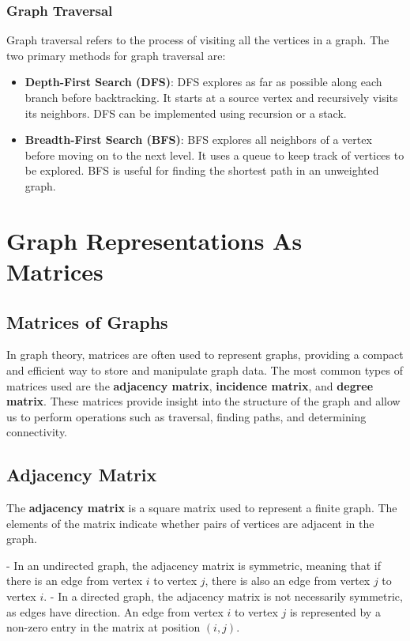 \documentclass{book}
\begin{document}
\subsection{Graph Traversal}

Graph traversal refers to the process of visiting all the vertices in a graph. The two primary methods for graph traversal are:

\begin{itemize}
    \item \textbf{Depth-First Search (DFS)}: DFS explores as far as possible along each branch before backtracking. It starts at a source vertex and recursively visits its neighbors. DFS can be implemented using recursion or a stack.
    \item \textbf{Breadth-First Search (BFS)}: BFS explores all neighbors of a vertex before moving on to the next level. It uses a queue to keep track of vertices to be explored. BFS is useful for finding the shortest path in an unweighted graph.
\end{itemize}

\twocolumn
\chapter{Graph Representations As Matrices}

\section{Matrices of Graphs}

In graph theory, matrices are often used to represent graphs, providing a compact and efficient way to store and manipulate graph data. The most common types of matrices used are the \textbf{adjacency matrix}, \textbf{incidence matrix}, and \textbf{degree matrix}. These matrices provide insight into the structure of the graph and allow us to perform operations such as traversal, finding paths, and determining connectivity.

\section{Adjacency Matrix}

The \textbf{adjacency matrix} is a square matrix used to represent a finite graph. The elements of the matrix indicate whether pairs of vertices are adjacent in the graph. 

- In an undirected graph, the adjacency matrix is symmetric, meaning that if there is an edge from vertex \(i\) to vertex \(j\), there is also an edge from vertex \(j\) to vertex \(i\).
- In a directed graph, the adjacency matrix is not necessarily symmetric, as edges have direction. An edge from vertex \(i\) to vertex \(j\) is represented by a non-zero entry in the matrix at position \((i, j)\).
\end{document}
